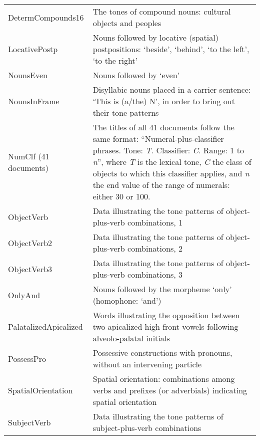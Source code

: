 \begin{refsection}
\begin{table}[H]
	{\renewcommand{\arraystretch}{1.35}
		\begin{tabularx}{\textwidth}{ @{}l Q }
      DetermCompounds16 & The tones of compound nouns: cultural objects and peoples\\
      LocativePostp & Nouns followed by locative (spatial) postpositions: ‘beside', ‘behind', ‘to the left', ‘to the right'\\
      NounsEven & Nouns followed by ‘even'\\
      NounsInFrame & Disyllabic nouns placed in a carrier sentence: ‘This is \mbox{(a/the)} N', in order to bring out their tone patterns\\
      NumClf (41 documents) & The titles of all 41 documents follow
      the same format: “Numeral-plus-classifier phrases. Tone:
      \textit{T}. Classifier: \textit{C}. Range: 1 to \textit{n}'',
      where \textit{T} is the lexical tone, \textit{C} the class of
      objects to which this classifier applies, and \textit{n} the end
      value of the range of numerals: either 30 or 100.\\
      ObjectVerb & Data illustrating the tone patterns of object-plus-verb combinations, 1\\
      ObjectVerb2 & Data illustrating the tone patterns of object-plus-verb combinations, 2\\
      ObjectVerb3 & Data illustrating the tone patterns of object-plus-verb combinations, 3\\
      OnlyAnd & Nouns followed by the morpheme ‘only' (homophone: ‘and')\\
      PalatalizedApicalized & Words illustrating the opposition between two apicalized high front vowels following alveolo-palatal initials\\
      PossessPro & Possessive constructions with pronouns, without an intervening particle\\
      SpatialOrientation & Spatial orientation: combinations among verbs and prefixes (or adverbials) indicating spatial orientation\\
      SubjectVerb & Data illustrating the tone patterns of subject-plus-verb combinations\\
    \end{tabularx}}
	\end{table}


\end{refsection}

